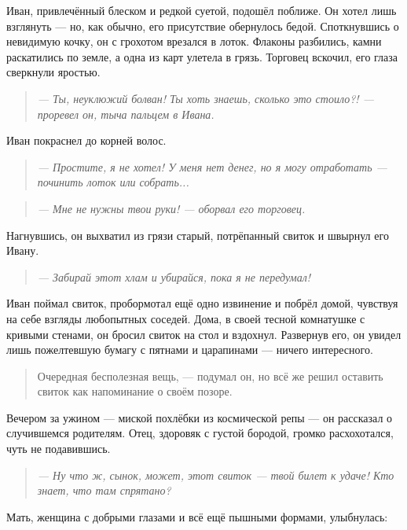 \documentclass[12pt,a4paper]{book}
\newenvironment{dialogue}{\begin{quote}\itshape}{\end{quote}} %
\begin{document}
Иван, привлечённый блеском и редкой суетой, подошёл поближе. Он хотел лишь взглянуть --- но, как обычно, его присутствие обернулось бедой. Споткнувшись о невидимую кочку, он с грохотом врезался в лоток. Флаконы разбились, камни раскатились по земле, а одна из карт улетела в грязь. Торговец вскочил, его глаза сверкнули яростью.

\begin{dialogue}
--- Ты, неуклюжий болван! Ты хоть знаешь, сколько это стоило?! --- проревел он, тыча пальцем в Ивана.
\end{dialogue}

Иван покраснел до корней волос.

\begin{dialogue}
--- Простите, я не хотел! У меня нет денег, но я могу отработать --- починить лоток или собрать...
\end{dialogue}

\begin{dialogue}
--- Мне не нужны твои руки! --- оборвал его торговец.
\end{dialogue}

Нагнувшись, он выхватил из грязи старый, потрёпанный свиток и швырнул его Ивану.

\begin{dialogue}
--- Забирай этот хлам и убирайся, пока я не передумал!
\end{dialogue}

Иван поймал свиток, пробормотал ещё одно извинение и побрёл домой, чувствуя на себе взгляды любопытных соседей. Дома, в своей тесной комнатушке с кривыми стенами, он бросил свиток на стол и вздохнул. Развернув его, он увидел лишь пожелтевшую бумагу с пятнами и царапинами --- ничего интересного.

\begin{quote}
Очередная бесполезная вещь, --- подумал он, но всё же решил оставить свиток как напоминание о своём позоре.
\end{quote}

Вечером за ужином --- миской похлёбки из космической репы --- он рассказал о случившемся родителям. Отец, здоровяк с густой бородой, громко расхохотался, чуть не подавившись.

\begin{dialogue}
--- Ну что ж, сынок, может, этот свиток --- твой билет к удаче! Кто знает, что там спрятано?
\end{dialogue}

Мать, женщина с добрыми глазами и всё ещё пышными формами, улыбнулась:
\end{document}
